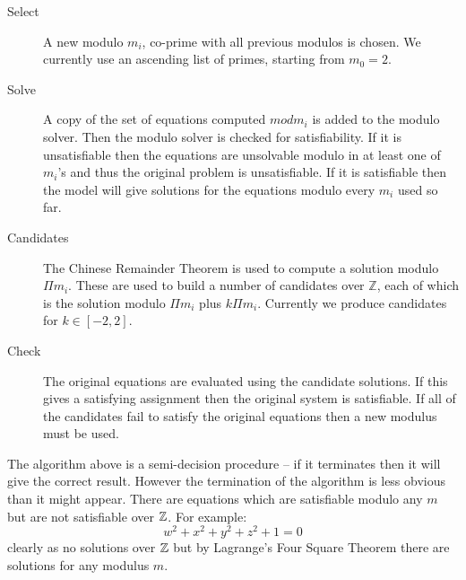 \begin{description}
\item[Select]{A new modulo $m_i$, co-prime with all previous modulos is chosen.
We currently use an ascending list of primes, starting from $m_0 = 2$.}

\item[Solve]{A copy of the set of equations computed $mod m_i$ is added
  to the modulo solver.  Then the modulo solver is checked for
  satisfiability.  If it is unsatisfiable then the equations are unsolvable
  modulo in at least one of $m_i$'s and thus the original problem is
  unsatisfiable.  If it is satisfiable then the model will give
  solutions for the equations modulo every $m_i$ used so far.}

\item[Candidates]{The Chinese Remainder Theorem is used to compute
  a solution modulo $\Pi m_i$.  These are used to build a number of
  candidates over $\mathbb{Z}$, each of which is the solution
  modulo $\Pi m_i$ plus $k \Pi m_i$.  Currently we produce candidates
  for  $k \in [-2,2]$.}

\item[Check]{The original equations are evaluated using the candidate
  solutions.  If this gives a satisfying assignment then the original
  system is satisfiable.  If all of the candidates fail to satisfy the
  original equations then a new modulus must be used.}
\end{description}



%

The algorithm above is a semi-decision procedure -- if it terminates
then it will give the correct result.
%
However the termination of the algorithm is less obvious than it might
appear.
%
There are equations which are satisfiable modulo any $m$ but are not
satisfiable over $\mathbb{Z}$.
For example:
%
\begin{equation*}
  w^2 + x^2 + y^2 + z^2 + 1 = 0
\end{equation*}
%
\noindent clearly as no solutions over $\mathbb{Z}$ but by Lagrange's Four
Square Theorem there are solutions for any modulus $m$.
